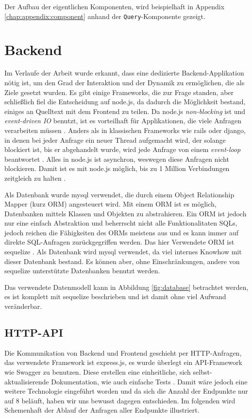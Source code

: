 \documentclass[12pt,twoside]{book}
\begin{document}
Der Aufbau der eigentlichen Komponenten, wird beispielhaft in Appendix \ref{chap:appendix:component} anhand der \texttt{Query}-Komponente gezeigt.

\section{Backend}\label{sec:backend}

Im Verlaufe der Arbeit wurde erkannt, dass eine dedizierte Backend-Applikation nötig ist, um den Grad der Interaktion und der Dynamik zu ermöglichen, die als Ziele gesetzt wurden. Es gibt einige Frameworks, die zur Frage standen, aber schließlich fiel die Entscheidung auf node.js, da dadurch die Möglichkeit bestand, einiges an Quelltext mit dem Frontend zu teilen. Da node.js \textit{non-blocking} ist und \textit{event-driven IO} benutzt, ist es vorteilhaft für Applikationen, die viele Anfragen verarbeiten müssen \citep{tilkov2010node}. Anders als in klassischen Frameworks wie rails oder django, in denen bei jeder Anfrage ein neuer Thread aufgemacht wird, der solange blockiert ist, bis er abgehandelt wurde, wird jede Anfrage von einem \textit{event-loop} beantwortet \citep{tilkov2010node}. Alles in node.js ist asynchron, weswegen diese Anfragen nicht blockieren. Damit ist es mit node.js möglich, bis zu 1 Million Verbindungen zeitgleich zu halten \cite{node1m}.

Als Datenbank wurde mysql verwendet, die durch einem Object Relationship Mapper (kurz ORM) angesteuert wird. Mit einem ORM ist es möglich, Datenbanken mittels Klassen und Objekten zu abstrahieren. Ein ORM ist jedoch nur eine einfach Abstraktion und beherrscht nicht alle Funktionalitaten SQLs, jedoch reichen die Fähigkeiten des ORMs meistens aus und es kann immer auf direkte SQL-Anfragen zurückgegriffen werden. Das hier Verwendete ORM ist sequelize \cite{sequelize}. Als Datenbank wird mysql verwendet, da viel internes Knowhow mit dieser Datenbank bestand. Es können aber, ohne Einschränkungen, andere von sequelize unterstützte Datenbanken benutzt werden.

Das verwendete Datenmodell kann in Abbildung \ref{fig:database} betrachtet werden, es ist komplett mit sequelize beschrieben und ist damit ohne viel Aufwand veränderbar.

\subsection{HTTP-API}

Die Kommunikation von Backend und Frontend geschieht per HTTP-Anfragen, das verwendete Framework ist express.js, es wurde überlegt ein API-Framework wie Swagger \cite{swagger} zu benutzen. Diese erstellen eine einheitliche, sich selbst-aktualisierende Dokumentation, wie auch einfache Tests \cite{haupt2014model}.
Damit wäre jedoch eine weitere Technologie eingeführt worden und da sich die Anzahl der Endpunkte nur auf 8 beläuft, haben wir uns bewusst dagegen entschieden. Im folgenden wird Schemenhaft der Ablauf der Anfragen aller Endpunkte illustriert.
\end{document}
